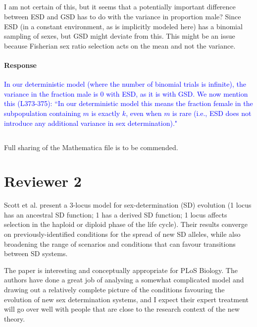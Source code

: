 \documentclass[10pt,letterpaper]{article}
\begin{document}
\noindent\subsection{}
I am not certain of this, but it seems that a potentially important difference between ESD and GSD has to do with the variance in proportion male? Since ESD (in a constant environment, as is implicitly modeled here) has a binomial sampling of sexes, but GSD might deviate from this.  This might be an issue because Fisherian sex ratio selection acts on the mean and not the variance.

\noindent\paragraph{Response}
\textcolor{blue}{In our deterministic model (where the number of binomial trials is infinite), the variance in the fraction male is 0 with ESD, as it is with GSD. 
We now mention this (L373-375): ``In our deterministic model this means the fraction female in the subpopulation containing $m$ is exactly $k$, even when $m$ is rare (i.e., ESD does not introduce any additional variance in sex determination)."
 }

\noindent\subsection{}
Full sharing of the Mathematica file is to be commended.

\section{Reviewer 2}

Scott et al. present a 3-locus model for sex-determination (SD) evolution (1 locus has an ancestral SD function; 1 has a derived SD function; 1 locus affects selection in the haploid or diploid phase of the life cycle). Their results converge on previously-identified conditions for the spread of new SD alleles, while also broadening the range of scenarios and conditions that can favour transitions between SD systems.

The paper is interesting and conceptually appropriate for PLoS Biology. The authors have done a great job of analysing a somewhat complicated model and drawing out a relatively complete picture of the conditions favouring the evolution of new sex determination systems, and I expect their expert treatment will go over well with people that are close to the research context of the new theory.
\end{document}
